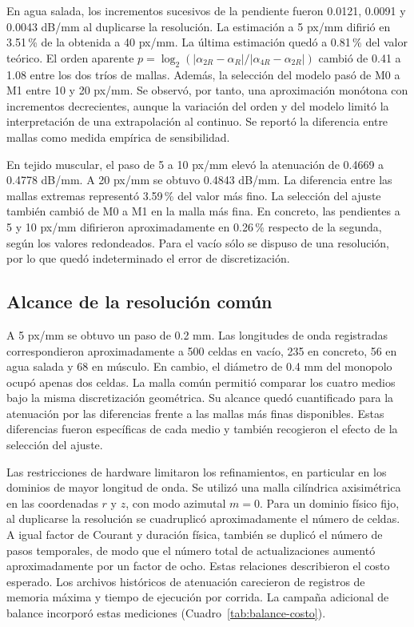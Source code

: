 En agua salada, los incrementos sucesivos de la pendiente fueron 0.0121, 0.0091 y 0.0043 dB/mm al duplicarse la resolución. La estimación a 5 px/mm difirió en 3.51\,\% de la obtenida a 40 px/mm. La última estimación quedó a 0.81\,\% del valor teórico. El orden aparente $p=\log_2(|\alpha_{2R}-\alpha_R|/|\alpha_{4R}-\alpha_{2R}|)$ cambió de 0.41 a 1.08 entre los dos tríos de mallas. Además, la selección del modelo pasó de M0 a M1 entre 10 y 20 px/mm. Se observó, por tanto, una aproximación monótona con incrementos decrecientes, aunque la variación del orden y del modelo limitó la interpretación de una extrapolación al continuo. Se reportó la diferencia entre mallas como medida empírica de sensibilidad.

En tejido muscular, el paso de 5 a 10 px/mm elevó la atenuación de 0.4669 a 0.4778 dB/mm. A 20 px/mm se obtuvo 0.4843 dB/mm. La diferencia entre las mallas extremas representó 3.59\,\% del valor más fino. La selección del ajuste también cambió de M0 a M1 en la malla más fina. En concreto, las pendientes a 5 y 10 px/mm difirieron aproximadamente en 0.26\,\% respecto de la segunda, según los valores redondeados. Para el vacío sólo se dispuso de una resolución, por lo que quedó indeterminado el error de discretización.

\subsection{Alcance de la resolución común}
A 5 px/mm se obtuvo un paso de 0.2 mm. Las longitudes de onda registradas correspondieron aproximadamente a 500 celdas en vacío, 235 en concreto, 56 en agua salada y 68 en músculo. En cambio, el diámetro de 0.4 mm del monopolo ocupó apenas dos celdas. La malla común permitió comparar los cuatro medios bajo la misma discretización geométrica. Su alcance quedó cuantificado para la atenuación por las diferencias frente a las mallas más finas disponibles. Estas diferencias fueron específicas de cada medio y también recogieron el efecto de la selección del ajuste.

Las restricciones de hardware limitaron los refinamientos, en particular en los dominios de mayor longitud de onda. Se utilizó una malla cilíndrica axisimétrica en las coordenadas $r$ y $z$, con modo azimutal $m=0$. Para un dominio físico fijo, al duplicarse la resolución se cuadruplicó aproximadamente el número de celdas. A igual factor de Courant y duración física, también se duplicó el número de pasos temporales, de modo que el número total de actualizaciones aumentó aproximadamente por un factor de ocho. Estas relaciones describieron el costo esperado. Los archivos históricos de atenuación carecieron de registros de memoria máxima y tiempo de ejecución por corrida. La campaña adicional de balance incorporó estas mediciones (Cuadro~\ref{tab:balance-costo}).

